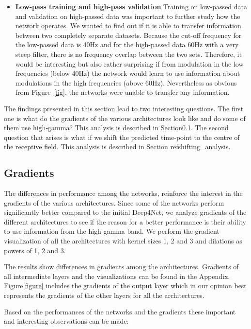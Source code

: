 \begin{itemize}
    \item \textbf{Low-pass training and high-pass validation}
Training on low-passed data and validation on high-passed data was important to further study how the network operates.
We wanted to find out if it is able to transfer information between two completely separate datasets.
Because the cut-off frequency for the low-passed data is 40Hz and for the high-passed data 60Hz with a very steep filter, there is no frequency overlap between the two sets.
Therefore, it would be interesting but also rather surprising if from modulation in the low frequencies (below 40Hz) the network would learn to use information about modulations in the high frequencies (above 60Hz).
Nevertheless as obvious from Figure~\ref{fig}, the networks were unable to transfer any information.
\end{itemize}
The findings presented in this section lead to two interesting questions.
The first one  is what do the gradients of the various architectures look like and do some of them use high-gamma?
This analysis is described in Section\ref{subsec:gradients}.
The second question that arises is what if  we shift the predicted time-point to the centre of the receptive field.
This analysis is described in Section ref{shifting\_analysis}.

\subsection{Gradients}\label{subsec:gradients}
The differences in performance among the networks, reinforce the interest in the gradients of the various architectures.
Since some of the networks perform significantly better compared to the initial Deep4Net, we analyze gradients of the different architectures to see if the reason for a better performance is their ability to use information from the high-gamma band.
We perform the gradient visualization of all the architectures with kernel sizes 1, 2 and 3 and dilations as powers of 1, 2 and 3.

The results show differences in gradients among the architectures.
Gradients of all intermediate layers and the visualizations can be found in the Appendix.
Figure\ref{figure} includes the gradients of the output layer which in our opinion best represents the gradients of the other layers for all the architectures.

Based on the performances of the networks and the gradients these important and interesting observations can be made:

